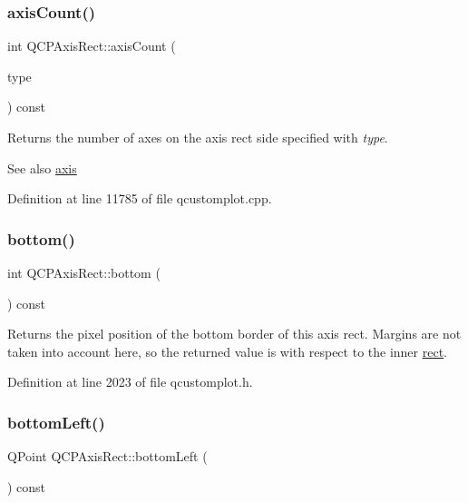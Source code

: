 \subsubsection{\texorpdfstring{axis\+Count()}{axisCount()}}
{\footnotesize\ttfamily int Q\+C\+P\+Axis\+Rect\+::axis\+Count (\begin{DoxyParamCaption}\item[{\hyperlink{class_q_c_p_axis_ae2bcc1728b382f10f064612b368bc18a}{Q\+C\+P\+Axis\+::\+Axis\+Type}}]{type }\end{DoxyParamCaption}) const}

Returns the number of axes on the axis rect side specified with {\itshape type}.

\begin{DoxySeeAlso}{See also}
\hyperlink{class_q_c_p_axis_rect_a583ae4f6d78b601b732183f6cabecbe1}{axis} 
\end{DoxySeeAlso}


Definition at line 11785 of file qcustomplot.\+cpp.

\mbox{\label{class_q_c_p_axis_rect_acefdf1abaa8a8ab681e906cc2be9581e}} 
\subsubsection{\texorpdfstring{bottom()}{bottom()}}
{\footnotesize\ttfamily int Q\+C\+P\+Axis\+Rect\+::bottom (\begin{DoxyParamCaption}{ }\end{DoxyParamCaption}) const\hspace{0.3cm}{\ttfamily [inline]}}

Returns the pixel position of the bottom border of this axis rect. Margins are not taken into account here, so the returned value is with respect to the inner \hyperlink{class_q_c_p_layout_element_a208effccfe2cca4a0eaf9393e60f2dd4}{rect}. 

Definition at line 2023 of file qcustomplot.\+h.

\mbox{\label{class_q_c_p_axis_rect_ab15d4311d6535ccd7af504dc0e2b98c6}} 
\subsubsection{\texorpdfstring{bottom\+Left()}{bottomLeft()}}
{\footnotesize\ttfamily Q\+Point Q\+C\+P\+Axis\+Rect\+::bottom\+Left (\begin{DoxyParamCaption}{ }\end{DoxyParamCaption}) const\hspace{0.3cm}{\ttfamily [inline]}}

